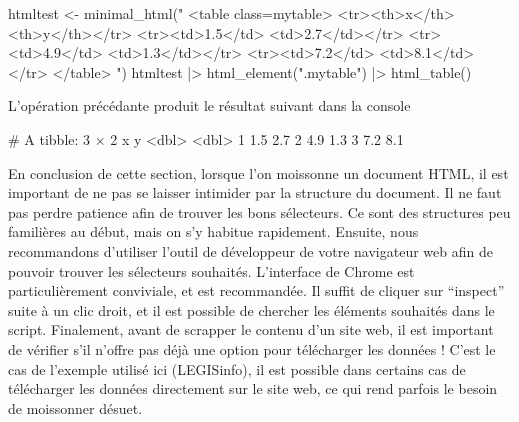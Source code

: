 \documentclass[
  letterpaper,
  DIV=11,
  numbers=noendperiod]{scrreprt}
\newenvironment{Shaded}{\begin{snugshade}}{\end{snugshade}}
\newcommand{\CommentTok}[1]{\textcolor[rgb]{0.37,0.37,0.37}{#1}}
\newcommand{\ErrorTok}[1]{\textcolor[rgb]{0.68,0.00,0.00}{#1}}
\newcommand{\ExtensionTok}[1]{\textcolor[rgb]{0.00,0.23,0.31}{#1}}
\newcommand{\KeywordTok}[1]{\textcolor[rgb]{0.00,0.23,0.31}{#1}}
\newcommand{\NormalTok}[1]{\textcolor[rgb]{0.00,0.23,0.31}{#1}}
\newcommand{\OperatorTok}[1]{\textcolor[rgb]{0.37,0.37,0.37}{#1}}
\newcommand{\StringTok}[1]{\textcolor[rgb]{0.13,0.47,0.30}{#1}}
\begin{document}
\begin{Shaded}
\begin{Highlighting}[]
\ExtensionTok{htmltest} \OperatorTok{\textless{}}\NormalTok{{-} minimal\_html}\ErrorTok{(}\StringTok{"}
\StringTok{  \textless{}table class=\textquotesingle{}mytable\textquotesingle{}\textgreater{}}
\StringTok{    \textless{}tr\textgreater{}\textless{}th\textgreater{}x\textless{}/th\textgreater{}   \textless{}th\textgreater{}y\textless{}/th\textgreater{}\textless{}/tr\textgreater{}}
\StringTok{    \textless{}tr\textgreater{}\textless{}td\textgreater{}1.5\textless{}/td\textgreater{} \textless{}td\textgreater{}2.7\textless{}/td\textgreater{}\textless{}/tr\textgreater{}}
\StringTok{    \textless{}tr\textgreater{}\textless{}td\textgreater{}4.9\textless{}/td\textgreater{} \textless{}td\textgreater{}1.3\textless{}/td\textgreater{}\textless{}/tr\textgreater{}}
\StringTok{    \textless{}tr\textgreater{}\textless{}td\textgreater{}7.2\textless{}/td\textgreater{} \textless{}td\textgreater{}8.1\textless{}/td\textgreater{}\textless{}/tr\textgreater{}}
\StringTok{  \textless{}/table\textgreater{}}
\StringTok{  "}\KeywordTok{)}
  \ExtensionTok{htmltest} \KeywordTok{|}\OperatorTok{\textgreater{}}
  \ExtensionTok{html\_element}\ErrorTok{(}\StringTok{".mytable"}\KeywordTok{)} \KeywordTok{|}\OperatorTok{\textgreater{}}\NormalTok{ html\_table}\KeywordTok{()}
\end{Highlighting}
\end{Shaded}

L'opération précédante produit le résultat suivant dans la console

\begin{Shaded}
\begin{Highlighting}[]
\CommentTok{\# A tibble: 3 × 2}
      \ExtensionTok{x}\NormalTok{     y}
  \OperatorTok{\textless{}}\NormalTok{dbl}\OperatorTok{\textgreater{}} \OperatorTok{\textless{}}\NormalTok{dbl}\OperatorTok{\textgreater{}}
\ExtensionTok{1}\NormalTok{   1.5   2.7}
\ExtensionTok{2}\NormalTok{   4.9   1.3}
\ExtensionTok{3}\NormalTok{   7.2   8.1}
\end{Highlighting}
\end{Shaded}

En conclusion de cette section, lorsque l'on moissonne un document HTML,
il est important de ne pas se laisser intimider par la structure du
document. Il ne faut pas perdre patience afin de trouver les bons
sélecteurs. Ce sont des structures peu familières au début, mais on s'y
habitue rapidement. Ensuite, nous recommandons d'utiliser l'outil de
développeur de votre navigateur web afin de pouvoir trouver les
sélecteurs souhaités. L'interface de Chrome est particulièrement
conviviale, et est recommandée. Il suffit de cliquer sur ``inspect''
suite à un clic droit, et il est possible de chercher les éléments
souhaités dans le script. Finalement, avant de scrapper le contenu d'un
site web, il est important de vérifier s'il n'offre pas déjà une option
pour télécharger les données ! C'est le cas de l'exemple utilisé ici
(LEGISinfo), il est possible dans certains cas de télécharger les
données directement sur le site web, ce qui rend parfois le besoin de
moissonner désuet.
\end{document}
